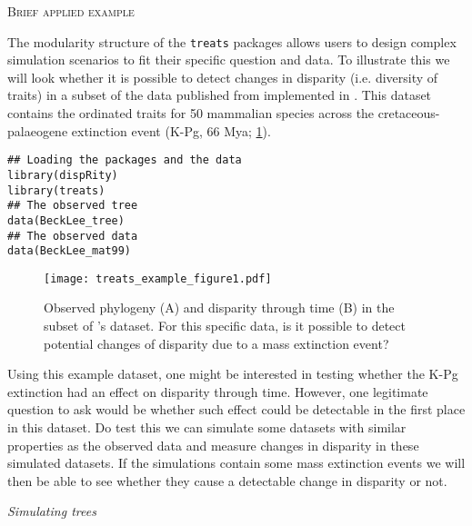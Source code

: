 \documentclass[12pt,letterpaper]{article}
\renewcommand{\section}[1]{%
\bigskip
\begin{center}
\begin{Large}
\normalfont\scshape #1
\medskip
\end{Large}
\end{center}}
\renewcommand{\subsection}[1]{%
\bigskip
\begin{center}
\begin{large}
\normalfont\itshape #1
\end{large}
\end{center}}
\newcommand{\treats}{\texttt{treats} }
\begin{document}
\section{Brief applied example}

The modularity structure of the \treats packages allows users to design complex simulation scenarios to fit their specific question and data.
To illustrate this we will look whether it is possible to detect changes in disparity (i.e. diversity of traits) in a subset of the data published from \cite{beck2014ancient} implemented in \cite{dispRity}.
This dataset contains the ordinated traits for 50 mammalian species across the cretaceous-palaeogene extinction event (K-Pg, 66 Mya; \ref{Fig:example1}).

\begin{lstlisting}
## Loading the packages and the data
library(dispRity)
library(treats)
## The observed tree
data(BeckLee_tree)
## The observed data
data(BeckLee_mat99)
\end{lstlisting}

\begin{figure}[!htbp]
\centering
   \texttt{[image: treats\_example\_figure1.pdf]} 
\caption{Observed phylogeny (A) and disparity through time (B) in the subset of \cite{beck2014ancient}'s dataset. For this specific data, is it possible to detect potential changes of disparity due to a mass extinction event?}
\label{Fig:example1}
\end{figure}

Using this example dataset, one might be interested in testing whether the K-Pg extinction had an effect on disparity through time.
However, one legitimate question to ask would be whether such effect could be detectable in the first place in this dataset.
Do test this we can simulate some datasets with similar properties as the observed data and measure changes in disparity in these simulated datasets.
If the simulations contain some mass extinction events we will then be able to see whether they cause a detectable change in disparity or not.

\subsection{Simulating trees}
\end{document}
